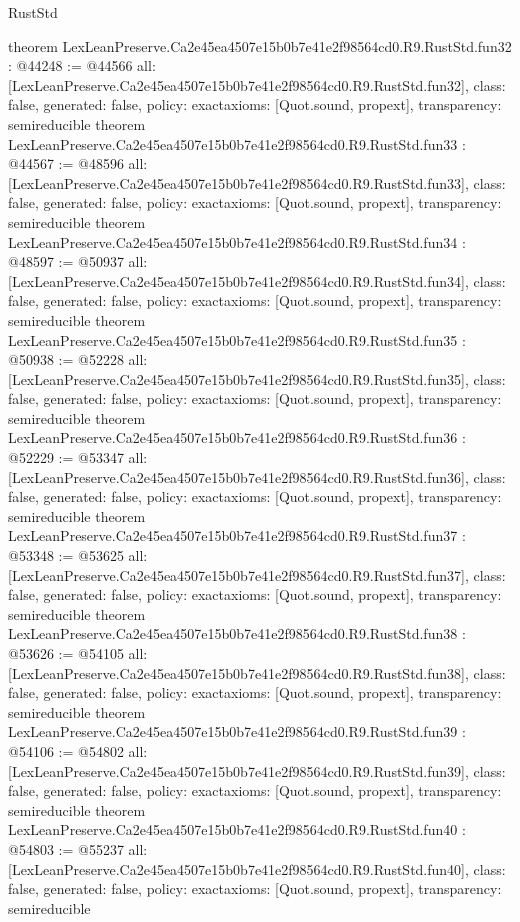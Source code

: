 \begin{lexlean}{RustStd}
\begin{coremodule}
{}
theorem LexLeanPreserve.Ca2e45ea4507e15b0b7e41e2f98564cd0.R9.RustStd.fun32 : @44248 := @44566 {
  all: [LexLeanPreserve.Ca2e45ea4507e15b0b7e41e2f98564cd0.R9.RustStd.fun32],
  class: false,
  generated: false,
  policy: exact{axioms: [Quot.sound, propext]},
  transparency: semireducible
}
theorem LexLeanPreserve.Ca2e45ea4507e15b0b7e41e2f98564cd0.R9.RustStd.fun33 : @44567 := @48596 {
  all: [LexLeanPreserve.Ca2e45ea4507e15b0b7e41e2f98564cd0.R9.RustStd.fun33],
  class: false,
  generated: false,
  policy: exact{axioms: [Quot.sound, propext]},
  transparency: semireducible
}
theorem LexLeanPreserve.Ca2e45ea4507e15b0b7e41e2f98564cd0.R9.RustStd.fun34 : @48597 := @50937 {
  all: [LexLeanPreserve.Ca2e45ea4507e15b0b7e41e2f98564cd0.R9.RustStd.fun34],
  class: false,
  generated: false,
  policy: exact{axioms: [Quot.sound, propext]},
  transparency: semireducible
}
theorem LexLeanPreserve.Ca2e45ea4507e15b0b7e41e2f98564cd0.R9.RustStd.fun35 : @50938 := @52228 {
  all: [LexLeanPreserve.Ca2e45ea4507e15b0b7e41e2f98564cd0.R9.RustStd.fun35],
  class: false,
  generated: false,
  policy: exact{axioms: [Quot.sound, propext]},
  transparency: semireducible
}
theorem LexLeanPreserve.Ca2e45ea4507e15b0b7e41e2f98564cd0.R9.RustStd.fun36 : @52229 := @53347 {
  all: [LexLeanPreserve.Ca2e45ea4507e15b0b7e41e2f98564cd0.R9.RustStd.fun36],
  class: false,
  generated: false,
  policy: exact{axioms: [Quot.sound, propext]},
  transparency: semireducible
}
theorem LexLeanPreserve.Ca2e45ea4507e15b0b7e41e2f98564cd0.R9.RustStd.fun37 : @53348 := @53625 {
  all: [LexLeanPreserve.Ca2e45ea4507e15b0b7e41e2f98564cd0.R9.RustStd.fun37],
  class: false,
  generated: false,
  policy: exact{axioms: [Quot.sound, propext]},
  transparency: semireducible
}
theorem LexLeanPreserve.Ca2e45ea4507e15b0b7e41e2f98564cd0.R9.RustStd.fun38 : @53626 := @54105 {
  all: [LexLeanPreserve.Ca2e45ea4507e15b0b7e41e2f98564cd0.R9.RustStd.fun38],
  class: false,
  generated: false,
  policy: exact{axioms: [Quot.sound, propext]},
  transparency: semireducible
}
theorem LexLeanPreserve.Ca2e45ea4507e15b0b7e41e2f98564cd0.R9.RustStd.fun39 : @54106 := @54802 {
  all: [LexLeanPreserve.Ca2e45ea4507e15b0b7e41e2f98564cd0.R9.RustStd.fun39],
  class: false,
  generated: false,
  policy: exact{axioms: [Quot.sound, propext]},
  transparency: semireducible
}
theorem LexLeanPreserve.Ca2e45ea4507e15b0b7e41e2f98564cd0.R9.RustStd.fun40 : @54803 := @55237 {
  all: [LexLeanPreserve.Ca2e45ea4507e15b0b7e41e2f98564cd0.R9.RustStd.fun40],
  class: false,
  generated: false,
  policy: exact{axioms: [Quot.sound, propext]},
  transparency: semireducible
}
\end{coremodule}
\end{lexlean}
